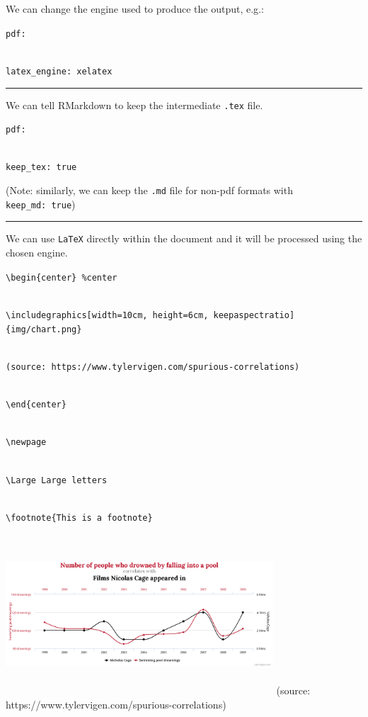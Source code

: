 \documentclass[
  11pt,
]{article}
\begin{document}
We can change the engine used to produce the output, e.g.:

\texttt{pdf:}\strut \\
\texttt{latex\_engine:\ xelatex}

\begin{center}\rule{0.5\linewidth}{0.5pt}\end{center}

We can tell RMarkdown to keep the intermediate \texttt{.tex} file.

\texttt{pdf:}\strut \\
\texttt{keep\_tex:\ true}

(Note: similarly, we can keep the \texttt{.md} file for non-pdf formats
with \texttt{keep\_md:\ true})

\begin{center}\rule{0.5\linewidth}{0.5pt}\end{center}

We can use \texttt{LaTeX} directly within the document and it will be
processed using the chosen engine.

\texttt{\textbackslash{}begin\{center\}\ \%center}\strut \\
\texttt{\textbackslash{}includegraphics{[}width=10cm,\ height=6cm,\ keepaspectratio{]}\{img/chart.png\}}\strut \\
\texttt{(source:\ https://www.tylervigen.com/spurious-correlations)}\strut \\
\texttt{\textbackslash{}end\{center\}}\strut \\
\texttt{\textbackslash{}newpage}\strut \\
\texttt{\textbackslash{}Large\ Large\ letters}\strut \\
\texttt{\textbackslash{}footnote\{This\ is\ a\ footnote\}}

\begin{center} %
  \includegraphics[width=10cm, height=6cm, keepaspectratio]{../img/chart.png}  
(source: https://www.tylervigen.com/spurious-correlations)
\end{center}
\newpage
\end{document}
